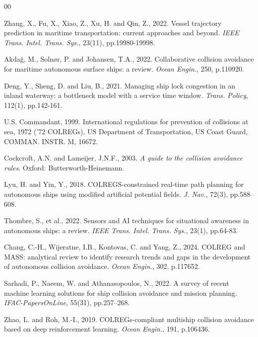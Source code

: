 \documentclass[final,5p,times,twocolumn]{elsarticle}
\begin{document}
\begin{thebibliography}{00}

Zhang, X., Fu, X., Xiao, Z., Xu, H. and Qin, Z., 2022. Vessel trajectory prediction in maritime transportation: current approaches and beyond. \textit{IEEE Trans. Intel. Trans. Sys.}, 23(11), pp.19980-19998.

Akdağ, M., Solnør, P. and Johansen, T.A., 2022. Collaborative collision avoidance for maritime autonomous surface ships: a review. \textit{Ocean Engin.}, 250, p.110920.

Deng, Y., Sheng, D. and Liu, B., 2021. Managing ship lock congestion in an inland waterway: a bottleneck model with a service time window. \textit{Trans. Policy}, 112(1), pp.142-161.

U.S. Commandant, 1999. International regulations for prevention of collisions at sea, 1972 ('72 COLREGs). US Department of Transportation, US Coast Guard, COMMAN. INSTR. M, 16672.

Cockcroft, A.N. and Lameijer, J.N.F., 2003. \textit{A guide to the collision avoidance rules}. Oxford: Butterworth-Heinemann.

Lyu, H. and Yin, Y., 2018. COLREGS-constrained real-time path planning for autonomous ships using modified artificial potential fields. \textit{J. Nav.}, 72(3), pp.588–608.

Thombre, S., et al., 2022. Sensors and AI techniques for situational awareness in autonomous ships: a review. \textit{IEEE Trans. Intel. Trans. Sys.}, 23(1), pp.64-83.

Chang, C.-H., Wijeratne, I.B., Kontovas, C. and Yang, Z., 2024. COLREG and MASS: analytical review to identify research trends and gaps in the development of autonomous collision avoidance. \textit{Ocean Engin.}, 302, p.117652.

Sarhadi, P., Naeem, W. and Athanasopoulos, N., 2022. A survey of recent machine learning solutions for ship collision avoidance and mission planning. \textit{IFAC-PapersOnLine}, 55(31), pp.257–268.

Zhao, L. and Roh, M.-I., 2019. COLREGs-compliant multiship collision avoidance based on deep reinforcement learning. \textit{Ocean Engin.}, 191, p.106436.


\end{thebibliography}
\end{document}
